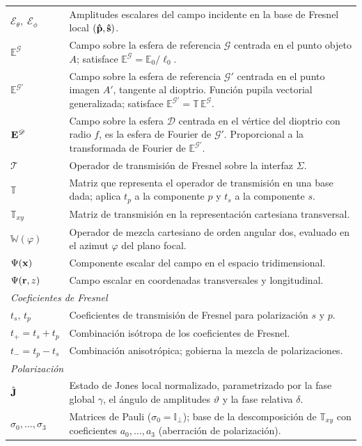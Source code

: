 \begin{longtable}{p{} p{}}
$\mathscr E_\theta,\;\mathscr E_\phi$ & Amplitudes escalares del campo incidente en la base de Fresnel local $(\bm{\hat{\mathbf{p}}}, \bm{\hat{\mathbf{s}}})$. \\
$\mathbb E^{\mathscr G}$ & Campo sobre la esfera de referencia $\mathscr G$ centrada en el punto objeto $A$; satisface $\mathbb E^{\mathscr G} = \mathbb E_0/\ell_0$. \\
\texorpdfstring{$\mathbb E^{\mathscr G'}$}{E\^{}G'} & Campo sobre la esfera de referencia $\mathscr G'$ centrada en el punto imagen $A'$, tangente al dioptrio. Función pupila vectorial generalizada; satisface $\mathbb E^{\mathscr G'} = \mathbb T\,\mathbb E^{\mathscr G}$. \\
$\vb E^{\mathscr D}$ & Campo sobre la esfera $\mathscr D$ centrada en el vértice del dioptrio con radio $f$, es la esfera de Fourier de $\mathscr G'$. Proporcional a la transformada de Fourier de $\mathbb E^{\mathscr G'}$. \\
$\mathscr T$ & Operador de transmisión de Fresnel sobre la interfaz $\Sigma$. \\
$\mathbb T$ & Matriz que representa el operador de transmisión en una base dada; aplica $t_p$ a la componente $p$ y $t_s$ a la componente $s$. \\
$\mathbb T_{xy}$ & Matriz de transmisión en la representación cartesiana transversal. \\
$\mathbb W(\varphi)$ & Operador de mezcla cartesiano de orden angular dos, evaluado en el azimut $\varphi$ del plano focal. \\
$\Psi(\vb x)$ & Componente escalar del campo en el espacio tridimensional. \\
$\Psi(\vb r,z)$ & Campo escalar en coordenadas transversales y longitudinal. \\
\hline
\multicolumn{2}{l}{\textit{Coeficientes de Fresnel}} \\
\hline
$t_s,\,t_p$ & Coeficientes de transmisión de Fresnel para polarización $s$ y $p$. \\
$t_+ = t_s+t_p$ & Combinación isótropa de los coeficientes de Fresnel. \\
$t_- = t_p-t_s$ & Combinación anisotrópica; gobierna la mezcla de polarizaciones. \\
\hline
\multicolumn{2}{l}{\textit{Polarización}} \\
\hline
$\hat{\vb J}$ & Estado de Jones local normalizado, parametrizado por la fase global $\gamma$, el ángulo de amplitudes $\vartheta$ y la fase relativa $\delta$. \\
$\sigma_0,\ldots,\sigma_3$ & Matrices de Pauli ($\sigma_0=\mathbb I_\perp$); base de la descomposición de $\mathbb T_{xy}$ con coeficientes $a_0,\ldots,a_3$ (aberración de polarización). \\

\end{longtable}
